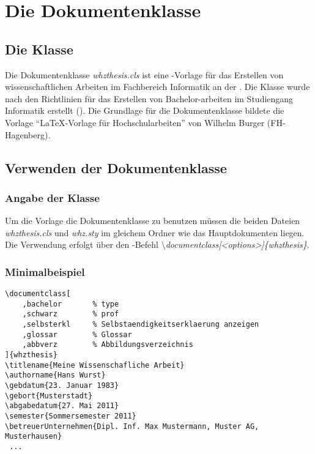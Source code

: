 \chapter{Die Dokumentenklasse}


\section{Die Klasse}
\label{sec:class_class}

Die Dokumentenklasse \textit{whzthesis.cls} ist eine \latex-Vorlage für das Erstellen von wissenschaftlichen Arbeiten im Fachbereich Informatik an der .
Die Klasse wurde nach den Richtlinien für das Erstellen von Bachelor-arbeiten im Studiengang Informatik erstellt (). 
Die Grundlage für die Dokumentenklasse bildete die Vorlage "`LaTeX-Vorlage für Hochschularbeiten"' von Wilhelm Burger (FH-Hagenberg)\cite{BURG11}. 


\section{Verwenden der Dokumentenklasse}
\label{sec:class_use}

\subsection{Angabe der Klasse}
Um die Vorlage \bzw die Dokumentenklasse zu benutzen müssen die beiden Dateien \textit{whzthesis.cls} und \textit{whz.sty} im gleichem Ordner wie
das Hauptdokumenten liegen. Die Verwendung erfolgt über den \latex-Befehl \textit{$\setminus$documentclass[<options>]\{whzthesis\}}.

\subsection{Minimalbeispiel}
\lstset{language=[LaTeX]TeX}
\begin{lstlisting}[caption=Beispiel für die Konfiguration der Dokumentenklasse]
\documentclass[
	,bachelor		% type
	,schwarz		% prof
	,selbsterkl		% Selbstaendigkeitserklaerung anzeigen
	,glossar		% Glossar	
	,abbverz		% Abbildungsverzeichnis
]{whzthesis}
\titlename{Meine Wissenschafliche Arbeit}
\authorname{Hans Wurst}
\gebdatum{23. Januar 1983}
\gebort{Musterstadt}
\abgabedatum{27. Mai 2011}
\semester{Sommersemester 2011} 
\betreuerUnternehmen{Dipl. Inf. Max Mustermann, Muster AG, Musterhausen}
 ...


\end{lstlisting}



